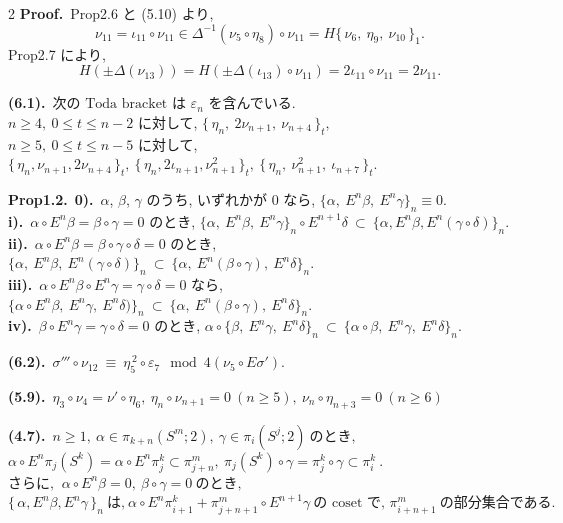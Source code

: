 \documentclass[10pt, leqno]{ltjsarticle}
\newcommand{\Ex}{E}        %
\newcommand{\todai}[2][]{\{\,#2\,\}_{#1}}      %
\newcommand{\pis}[2]{\pi_{#1}(#2)}       %
\newcommand{\pit}[2]{\pi_{#1}^{#2}}
\numberwithin{equation}{section}
\theoremstyle{plain}
\theoremstyle{definition}
\theoremstyle{remark}
\begin{document}
\begin{paracol}{2}
\noindent
\textbf{Proof.}\
Prop2.6 と (5.10) より,
\[
\nu_{11}=\iota_{11}\circ \nu_{11}\in \Delta^{-1}(\nu_5\circ \eta_8)\circ \nu_{11}
=H\todai[1]{\nu_6,\ \eta_9,\ \nu_{10}}.
\]
Prop2.7 により, 
\[
H(\pm\Delta(\nu_{13}))
= H(\pm \Delta(\iota_{13})\circ\nu_{11})
= 2\iota_{11}\circ\nu_{11}
= 2\nu_{11} .
\]

\switchcolumn

\noindent
\textbf{(6.1).}\ 
\(\text{次の Toda bracket は } \varepsilon_n \text{ を含んでいる. }\quad\)\\
\(n\ge4,\ 0\le t\le n-2\) に対して, 
\(
\todai[t]{\eta_n,\ 2\nu_{n+1},\ \nu_{n+4}},
\)\\
\(n\ge5,\ 0\le t\le n-5\) に対して, \\
\(
\todai[t]{\eta_n, \nu_{n+1}, 2\nu_{n+4}},\
\todai[t]{\eta_n, 2\iota_{n+1}, \nu_{n+1}^2},\
\todai[t]{\eta_n,\ \nu_{n+1}^{2},\ \iota_{n+7}} .
\)

\noindent
\textbf{Prop1.2.}\
\textbf{0).}\ $\alpha$, $\beta$, $\gamma$ のうち, いずれかが $0$ なら,
\(
\{\alpha,\ \Ex^n\beta,\ \Ex^n\gamma\}_n\equiv0.
\)\\
\textbf{i).}\ $\alpha\circ \Ex^n\beta=\beta\circ\gamma=0$ のとき,
\(
\{\alpha,\ \Ex^n\beta,\ \Ex^n\gamma\}_n\circ\Ex^{n+1}\delta\ \subset\ \{\alpha,\Ex^n \beta, \Ex^n(\gamma\circ\delta)\}_n.
\)\\
\textbf{ii).}\ $\alpha\circ \Ex^n\beta=\beta\circ\gamma\circ\delta=0$ のとき,
\(
\{\alpha,\ \Ex^n\beta,\ \Ex^n(\gamma\circ\delta)\}_n\ \subset\ \{\alpha,\ \Ex^n(\beta\circ\gamma),\ \Ex^n\delta\}_n .
\)\\
\textbf{iii).}\ $\alpha\circ\Ex^n\beta\circ\Ex^n\gamma=\gamma\circ\delta=0$ なら,
\(
\{\alpha\circ\Ex^n\beta,\ \Ex^n\gamma,\ \Ex^n\delta)\}_n\ \subset\ \{\alpha,\ \Ex^n(\beta\circ\gamma),\ \Ex^n\delta\}_n .
\)\\
\textbf{iv).}\ $\beta\circ\Ex^n\gamma=\gamma\circ\delta=0$ のとき,
\(
\alpha\circ\{\beta,\ \Ex^n\gamma,\ \Ex^n\delta\}_n\ \subset\ \{\alpha\circ\beta,\ \Ex^n\gamma,\ \Ex^n\delta\}_n .
\)

\noindent
\textbf{(6.2).}\ 
\(\sigma'''\circ \nu_{12}\ \equiv\ \eta_5^{\,2}\circ \varepsilon_7
\mod{4(\nu_5\circ E\sigma')} .\)

\noindent
\textbf{(5.9).}\
\(\eta_3\circ \nu_4= \nu'\circ \eta_6,\
\eta_n\circ \nu_{n+1}=0\ (n\ge5),\
\nu_n\circ \eta_{n+3}=0\ (n\ge6)\)

\noindent
\textbf{(4.7).}\
\(n\ge1, \ \alpha\in\pis{k+n}{S^m; 2},\ \gamma\in\pis{i}{S^j; 2}
    \ \text{のとき, }\)\\
\(\alpha\circ E^n\pis{j}{S^k} = \alpha\circ E^n \pit{j}{k}
  \subset \pit{j+n}{m},
  \ \pis{j}{S^k}\circ\gamma = \pit{j}{k}\circ\gamma \subset\pit{i}{k}\ . \)\\
\(\text{さらに, }\ \alpha\circ E^n\beta=0,\ \beta\circ\gamma = 0 \ \text{のとき, }\)\\
\(\todai[n]{\alpha, E^n\beta, E^n\gamma}\ \text{は,}\
  \alpha\circ E^n\pit{i+1}{k} + \pit{j+n+1}{m}\circ E^{n+1}\gamma\
  \text{の coset で, }\pit{i+n+1}{m} \ \text{の部分集合である. }\)


\end{paracol}
\end{document}
